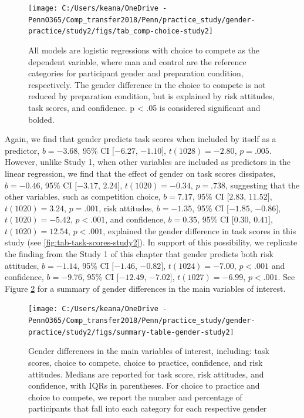 \documentclass[a4paper, nobind]{templates/ociamthesis}
\begin{document}
\begin{figure}

{\centering \texttt{[image: C:/Users/keana/OneDrive - PennO365/Comp\_transfer2018/Penn/practice\_study/gender-practice/study2/figs/tab\_comp-choice-study2]} 

}

\caption{All models are logistic regressions with choice to compete as the dependent variable, where man and control are the reference categories for participant gender and preparation condition, respectively. The gender difference in the choice to compete is not reduced by preparation condition, but is explained by risk attitudes, task scores, and confidence. p < .05 is considered significant and bolded.}\label{fig:tab-comp-choice-study2}
\end{figure}

Again, we find that gender predicts task scores when included by itself as a predictor, \(b = -3.68\), 95\% CI \([-6.27\), \(-1.10]\), \(t(1028) = -2.80\), \(p = .005\). However, unlike Study 1, when other variables are included as predictors in the linear regression, we find that the effect of gender on task scores dissipates, \(b = -0.46\), 95\% CI \([-3.17\), \(2.24]\), \(t(1020) = -0.34\), \(p = .738\), suggesting that the other variables, such as competition choice, \(b = 7.17\), 95\% CI \([2.83\), \(11.52]\), \(t(1020) = 3.24\), \(p = .001\), risk attitudes, \(b = -1.35\), 95\% CI \([-1.85\), \(-0.86]\), \(t(1020) = -5.42\), \(p < .001\), and confidence, \(b = 0.35\), 95\% CI \([0.30\), \(0.41]\), \(t(1020) = 12.54\), \(p < .001\), explained the gender difference in task scores in this study (see \ref{fig:tab-task-scores-study2}). In support of this possibility, we replicate the finding from the Study 1 of this chapter that gender predicts both risk attitudes, \(b = -1.14\), 95\% CI \([-1.46\), \(-0.82]\), \(t(1024) = -7.00\), \(p < .001\) and confidence,
\(b = -9.76\), 95\% CI \([-12.49\), \(-7.02]\), \(t(1027) = -6.99\), \(p < .001\). See Figure \ref{fig:summary-table-gender-study2} for a summary of gender differences in the main variables of interest.

\begin{figure}

{\centering \texttt{[image: C:/Users/keana/OneDrive - PennO365/Comp\_transfer2018/Penn/practice\_study/gender-practice/study2/figs/summary-table-gender-study2]} 

}

\caption{Gender differences in the main variables of interest, including: task scores, choice to compete, choice to practice, confidence, and risk attitudes. Medians are reported for task score, risk attitudes, and confidence, with IQRs in parentheses. For choice to practice and choice to compete, we report the number and percentage of participants that fall into each category for each respective gender}\label{fig:summary-table-gender-study2}
\end{figure}
\end{document}
